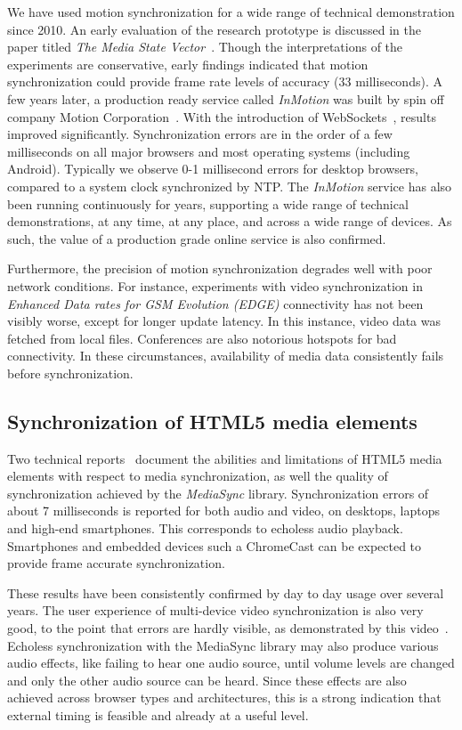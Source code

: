 \documentclass[graybox]{svmult}
\begin{document}
We have used motion synchronization for a wide range of technical
demonstration since 2010. An early evaluation of the research prototype is
discussed in the paper titled \emph{The Media State Vector}~\cite{msv}. Though
the interpretations of the experiments are conservative, early findings
indicated that motion synchronization could provide frame rate levels of
accuracy (33 milliseconds). A few years later, a production ready service
called \emph{InMotion} was built by spin off company Motion
Corporation~\cite{mcorp}. With the introduction of
WebSockets~\cite{websocket}, results improved significantly. Synchronization
errors are in the order of a few milliseconds on all major browsers and most
operating systems (including Android). Typically we observe 0-1 millisecond
errors for desktop browsers, compared to a system clock synchronized by NTP.
The \emph{InMotion} service has also been running continuously for years,
supporting a wide range of technical demonstrations, at any time, at any
place, and across a wide range of devices. As such, the value of a production
grade online service is also confirmed.

Furthermore, the precision of motion synchronization degrades well with poor
network conditions. For instance, experiments with video synchronization in \emph{Enhanced Data rates for GSM Evolution (EDGE)}
connectivity has not been visibly worse, except for longer update
latency. In this instance, video data was fetched from local files.
Conferences are also notorious hotspots for bad connectivity. In these
circumstances, availability of media data consistently fails before
synchronization.


\subsection {Synchronization of HTML5 media elements}

Two technical reports~\cite{syncreport1,syncreport2} document the abilities
and limitations of HTML5 media elements with respect to media synchronization,
as well the quality of synchronization achieved by the \emph{MediaSync}
library. Synchronization errors of about 7 milliseconds is reported for both
audio and video, on desktops, laptops and high-end smartphones. This
corresponds to echoless audio playback. Smartphones and embedded devices such
a ChromeCast can be expected to provide frame accurate synchronization. 

These results have been consistently confirmed by day to day usage over
several years. The user experience of multi-device video synchronization is
also very good, to the point that errors are hardly visible, as demonstrated by
this video~\cite{carneval}. Echoless synchronization with the MediaSync
library may also produce various audio effects, like failing to hear one audio
source, until volume levels are changed and only the other audio source can be
heard. Since these effects are also achieved across browser types and
architectures, this is a strong indication that external timing is feasible
and already at a useful level.
\end{document}
